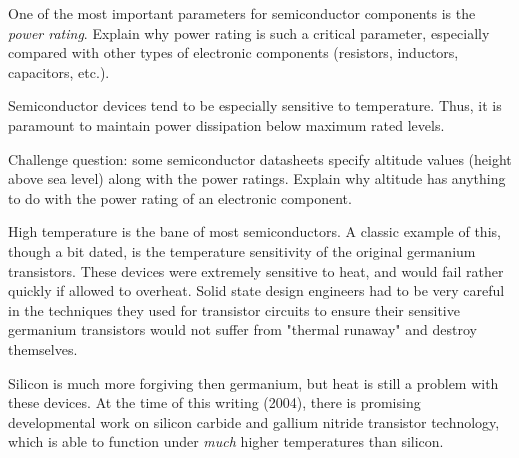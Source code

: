 

One of the most important parameters for semiconductor components is the {\it power rating}.  Explain why power rating is such a critical parameter, especially compared with other types of electronic components (resistors, inductors, capacitors, etc.).







Semiconductor devices tend to be especially sensitive to temperature.  Thus, it is paramount to maintain power dissipation below maximum rated levels.

\vskip 10pt

Challenge question: some semiconductor datasheets specify altitude values (height above sea level) along with the power ratings.  Explain why altitude has anything to do with the power rating of an electronic component.







High temperature is the bane of most semiconductors.  A classic example of this, though a bit dated, is the temperature sensitivity of the original germanium transistors.  These devices were extremely sensitive to heat, and would fail rather quickly if allowed to overheat.  Solid state design engineers had to be very careful in the techniques they used for transistor circuits to ensure their sensitive germanium transistors would not suffer from "thermal runaway" and destroy themselves.

Silicon is much more forgiving then germanium, but heat is still a problem with these devices.  At the time of this writing (2004), there is promising developmental work on silicon carbide and gallium nitride transistor technology, which is able to function under {\it much} higher temperatures than silicon.




